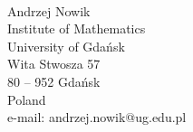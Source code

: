 \documentclass[12pt]{article}
\theoremstyle{plain}
\theoremstyle{definition}
\theoremstyle{remark}
\begin{document}
\begin{center}
	 \\
	Andrzej Nowik \\
	Institute of Mathematics \\
	University of Gda\'nsk \\
	Wita Stwosza 57 \\
	80 -- 952 Gda\'nsk \\
	Poland\\
	e-mail: andrzej.nowik@ug.edu.pl
\end{center}
\end{document}
